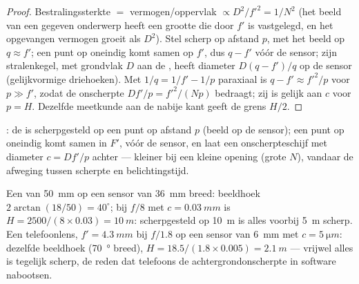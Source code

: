 \begin{proof}
Bestralingssterkte $=$ vermogen/oppervlak $\propto D^2/f'^2 = 1/N^2$ (het beeld
van een gegeven onderwerp heeft een grootte die door $f'$ is vastgelegd, en het
opgevangen vermogen groeit als $D^2$). Stel scherp op afstand $p$, met het beeld op $q \approx f'$;
een punt op oneindig komt samen op $f'$, dus $q - f'$ vóór de sensor;
zijn stralenkegel, met grondvlak $D$ aan de , heeft diameter $D(q - f')/q$
op de sensor (gelijkvormige driehoeken). Met $1/q = 1/f' - 1/p$ paraxiaal is
$q - f' \approx f'^2/p$ voor $p \gg f'$, zodat de onscherpte
$Df'/p = f'^2/(Np)$ bedraagt; zij is gelijk aan $c$ voor $p = H$. Dezelfde
meetkunde aan de nabije kant geeft de grens $H/2$.
\end{proof}

\begin{omfigure}

{\small {}: de  is scherpgesteld op een punt op afstand $p$
(beeld op de sensor); een punt op oneindig komt samen in $F'$, vóór de
sensor, en laat een onscherpteschijf met diameter $c = Df'/p$ achter --- kleiner bij een
kleine opening (grote $N$), vandaar de afweging tussen scherpte en
belichtingstijd.}
\end{omfigure}

\begin{example}\label{ex:b1:optical-instruments:cameras}
Een  van \qty{50}{mm} op een sensor van \qty{36}{mm} breed: beeldhoek
$2\arctan(18/50) = 40^\circ$; bij $f/8$ met $c = \qty{0.03}{mm}$ is
$H = 2500/(8 \times 0.03) = \qty{10}{m}$: scherpgesteld op \qty{10}{m} is
alles voorbij \qty{5}{m} scherp. Een telefoonlens, $f' = \qty{4.3}{mm}$
bij $f/1.8$ op een sensor van \qty{6}{mm} met $c = \qty{5}{\micro m}$: dezelfde
beeldhoek (\qty{70}{\degree} breed), $H = 18.5/(1.8 \times 0.005) =
\qty{2.1}{m}$ --- vrijwel alles is tegelijk scherp, de reden dat
telefoons de achtergrondonscherpte in software nabootsen.
\end{example}


